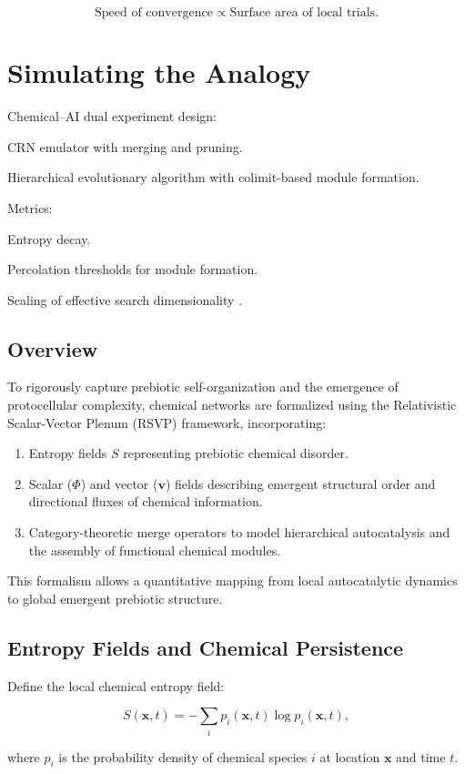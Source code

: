 \documentclass{book}
\begin{document}
\[\text{Speed of convergence} \propto \text{Surface area of local trials}.\]

\chapter{Simulating the Analogy}
Chemical–AI dual experiment design:

CRN emulator with merging and pruning.

Hierarchical evolutionary algorithm with colimit-based module formation.

Metrics:

Entropy decay.

Percolation thresholds for module formation.

Scaling of effective search dimensionality \citep{scalinghypothesis}.

\section{Overview}
To rigorously capture prebiotic self-organization and the emergence of protocellular complexity, chemical networks are formalized using the Relativistic Scalar-Vector Plenum (RSVP) framework, incorporating:

\begin{enumerate}
\item Entropy fields $S$ representing prebiotic chemical disorder.
\item Scalar ($\Phi$) and vector ($\mathbf{v}$) fields describing emergent structural order and directional fluxes of chemical information.
\item Category-theoretic merge operators to model hierarchical autocatalysis and the assembly of functional chemical modules.
\end{enumerate}

This formalism allows a quantitative mapping from local autocatalytic dynamics to global emergent prebiotic structure.

\section{Entropy Fields and Chemical Persistence}
Define the local chemical entropy field:

\[S(\mathbf{x}, t) = - \sum_i p_i(\mathbf{x}, t) \log p_i(\mathbf{x}, t),\]

where $p_i$ is the probability density of chemical species $i$ at location $\mathbf{x}$ and time $t$.
\end{document}
